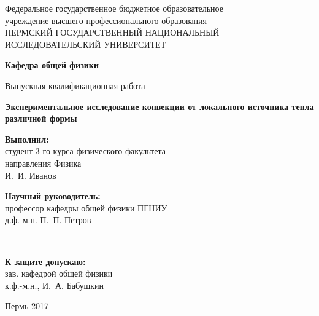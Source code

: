 \documentclass[14pt,a4paper]{extarticle}
\begin{document}
	
\begin{center}
	\thispagestyle{empty}
	Федеральное государственное бюджетное образовательное\\
	учреждение высшего профессионального образования\\	
	{\small ПЕРМСКИЙ ГОСУДАРСТВЕННЫЙ НАЦИОНАЛЬНЫЙ ИССЛЕДОВАТЕЛЬСКИЙ УНИВЕРСИТЕТ}
\end{center}

\vspace{5em}

\begin{center}
	\textbf{Кафедра общей физики}\\
\end{center}

\begin{center}
	\small {Выпускная квалификационная работа}\\
\end{center}

\begin{center}
	\large \textbf{Экспериментальное исследование конвекции от локального источника тепла различной формы}\\
\end{center}

\vspace{5em}

\begin{flushright}
	{\textbf{Выполнил:\\}студент 3-го курса физического факультета\\
		направления Физика\\	
		И.\, И. Иванов \underline{\hspace{100pt}\hspace{10pt}}
		\bigskip
		
		\textbf{Научный руководитель:}\\
		профессор кафедры общей физики ПГНИУ\\
		д.ф.-м.н. П.\, П. Петров}\underline{\hspace{100pt}\hspace{10pt}}\\
		\vspace{\fill}
\end{flushright}

\begin{flushleft}
	{\textbf{К защите допускаю:}\\ зав. кафедрой общей физики\\
		к.ф.-м.н., И.\, А. Бабушкин \underline{\hspace{100pt}\hspace{10pt}}}
	\vspace{\fill}
\end{flushleft}

\begin{center}
	Пермь 2017
\end{center}
\end{document}
